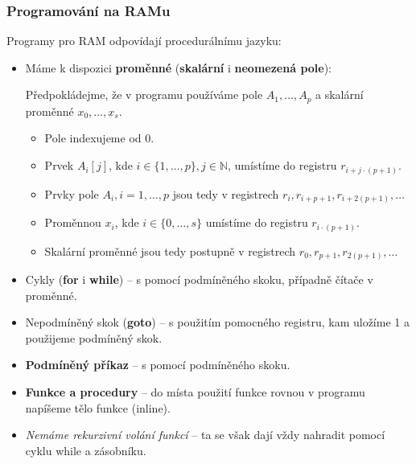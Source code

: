 \documentclass[11pt]{report} %
\newcommand{\N}{\mathbb{N}}
\begin{document}
\subsubsection{Programování na RAMu}
Programy pro RAM odpovídají procedurálnímu jazyku:
\begin{itemize}
	\leftskip 20pt
	\setlength{\itemsep}{0pt}
	\item Máme k dispozici \textbf{proměnné} (\textbf{skalární} i \textbf{neomezená pole}):
	
	Předpokládejme, že v programu používáme pole $A_1, \dots, A_p$ a skalární proměnné $x_0, \dots, x_s$.
	\begin{itemize}
		\leftskip 40pt
		\setlength{\itemsep}{0pt}
		
		\item Pole indexujeme od 0.
		\item Prvek $A_i[j]$, kde $i \in \{1, \dots, p\}, j \in \N$, umístíme do registru $r_{i+j\cdot(p+1)}$.
		\item Prvky pole $A_i, i = 1, \dots, p$ jsou tedy v registrech $r_i, r_{i+p+1}, r_{i+2(p+1)}, \dots$
		\item Proměnnou $x_i$, kde $i \in \{0, \dots, s\}$ umístíme do registru $r_{i\cdot(p+1)}$.
		\item Skalární proměnné jsou tedy postupně v registrech $r_0, r_{p+1}, r_{2(p+1)}, \dots$
	\end{itemize}

	\item Cykly (\textbf{for} i \textbf{while}) – s pomocí podmíněného skoku, případně čítače v proměnné.
	\item Nepodmíněný skok (\textbf{goto}) – s použitím pomocného registru, kam uložíme 1 a použijeme podmíněný skok.
	\item \textbf{Podmíněný příkaz} – s pomocí podmíněného skoku.
	\item \textbf{Funkce a procedury} – do místa použití funkce rovnou v programu napíšeme tělo funkce (inline).
	\item \textit{Nemáme rekurzivní volání funkcí} – ta se však dají vždy nahradit pomocí cyklu while a zásobníku.	
\end{itemize}
\end{document}
